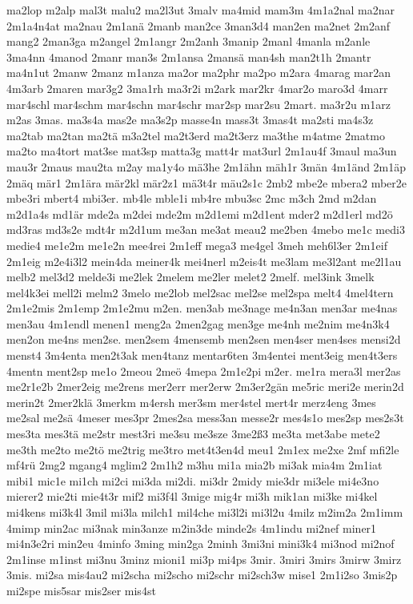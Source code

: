 {ma2lop
m2alp
mal3t
malu2
ma2l3ut
3malv
ma4mid
mam3m
4m1a2nal
ma2nar
2m1a4n4at
ma2nau
2m1anä
2manb
man2ce
3man3d4
man2en
ma2net
2m2anf
mang2
2man3ga
m2angel
2m1angr
2m2anh
3manip
2manl
4manla
m2anle
3ma4nn
4manod
2manr
man3s
2m1ansa
2mansä
man4sh
man2t1h
2mantr
ma4n1ut
2manw
2manz
m1anza
ma2or
ma2phr
ma2po
m2ara
4marag
mar2an
4m3arb
2maren
mar3g2
3ma1rh
ma3r2i
m2ark
mar2kr
4mar2o
maro3d
4marr
mar4schl
mar4schm
mar4schn
mar4schr
mar2sp
mar2su
2mart.
ma3r2u
m1arz
m2as
3mas.
ma3s4a
mas2e
ma3s2p
masse4n
mass3t
3mas4t
ma2sti
ma4s3z
ma2tab
ma2tan
ma2tä
m3a2tel
ma2t3erd
ma2t3erz
ma3the
m4atme
2matmo
ma2to
ma4tort
mat3se
mat3sp
matta3g
matt4r
mat3url
2m1au4f
3maul
ma3un
mau3r
2maus
mau2ta
m2ay
ma1y4o
mä3he
2m1ähn
mäh1r
3män
4m1änd
2m1äp
2mäq
mär1
2m1ära
mär2kl
mär2z1
mä3t4r
mäu2s1c
2mb2
mbe2e
mbera2
mber2e
mbe3ri
mbert4
mbi3er.
mb4le
mble1i
mb4re
mbu3sc
2mc
m3ch
2md
m2dan
m2d1a4s
md1är
mde2a
m2dei
mde2m
m2d1emi
m2d1ent
mder2
m2d1erl
md2ö
md3ras
md3s2e
mdt4r
m2d1um
me3an
me3at
meau2
me2ben
4mebo
me1c
medi3
medie4
me1e2m
me1e2n
mee4rei
2m1eff
mega3
me4gel
3meh
meh6l3er
2m1eif
2m1eig
m2e4i3l2
mein4da
meiner4k
mei4nerl
m2eis4t
me3lam
me3l2ant
me2l1au
melb2
mel3d2
melde3i
me2lek
2melem
me2ler
melet2
2melf.
mel3ink
3melk
mel4k3ei
mell2i
melm2
3melo
me2lob
mel2sac
mel2se
mel2spa
melt4
4mel4tern
2m1e2mis
2m1emp
2m1e2mu
m2en.
men3ab
me3nage
me4n3an
men3ar
me4nas
men3au
4m1endl
menen1
meng2a
2men2gag
men3ge
me4nh
me2nim
me4n3k4
men2on
me4ns
men2se.
men2sem
4mensemb
men2sen
men4ser
men4ses
mensi2d
menst4
3m4enta
men2t3ak
men4tanz
mentar6ten
3m4entei
ment3eig
men4t3ers
4mentn
ment2sp
me1o
2meou
2meö
4mepa
2m1e2pi
m2er.
me1ra
mera3l
mer2as
me2r1e2b
2mer2eig
me2rens
mer2err
mer2erw
2m3er2gän
me5ric
meri2e
merin2d
merin2t
2mer2klä
3merkm
m4ersh
mer3sm
mer4stel
mert4r
merz4eng
3mes
me2sal
me2sä
4meser
mes3pr
2mes2sa
mess3an
messe2r
mes4s1o
mes2sp
mes2s3t
mes3ta
mes3tä
me2str
mest3ri
me3su
me3sze
3me2ß3
me3ta
met3abe
mete2
me3th
me2to
me2tö
me2trig
me3tro
met4t3en4d
meu1
2m1ex
me2xe
2mf
mfi2le
mf4rü
2mg2
mgang4
mglim2
2m1h2
m3hu
mi1a
mia2b
mi3ak
mia4m
2m1iat
mibi1
mic1e
mi1ch
mi2ci
mi3da
mi2di.
mi3dr
2midy
mie3dr
mi3ele
mi4e3no
mierer2
mie2ti
mie4t3r
mif2
mi3f4l
3mige
mig4r
mi3h
mik1an
mi3ke
mi4kel
mi4kens
mi3k4l
3mil
mi3la
milch1
mil4che
mi3l2i
mi3l2u
4milz
m2im2a
2m1imm
4mimp
min2ac
mi3nak
min3anze
m2in3de
minde2s
4m1indu
mi2nef
miner1
mi4n3e2ri
min2eu
4minfo
3ming
min2ga
2minh
3mi3ni
mini3k4
mi3nod
mi2nof
2m1inse
m1inst
mi3nu
3minz
mioni1
mi3p
mi4ps
3mir.
3miri
3mirs
3mirw
3mirz
3mis.
mi2sa
mis4au2
mi2scha
mi2scho
mi2schr
mi2sch3w
mise1
2m1i2so
3mis2p
mi2spe
mis5sar
mis2ser
mis4st
}

